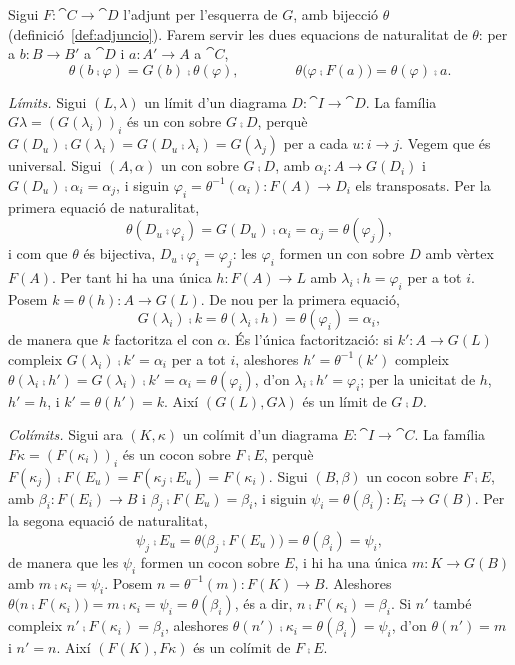 \begin{prova}
Sigui $F\colon\cat{C}\to\cat{D}$ l'adjunt per l'esquerra de $G$, amb bijecció $\theta$ (definició~\ref{def:adjuncio}). Farem servir les dues equacions de naturalitat de $\theta$: per a $b\colon B\to B'$ a $\cat{D}$ i $a\colon A'\to A$ a $\cat{C}$,
\[
\theta(b\comp\varphi)=G(b)\comp\theta(\varphi),
\qquad\qquad
\theta\bigl(\varphi\comp F(a)\bigr)=\theta(\varphi)\comp a.
\]

\emph{Límits.} Sigui $(L,\lambda)$ un límit d'un diagrama $D\colon\cat{I}\to\cat{D}$. La família $G\lambda=(G(\lambda_i))_i$ és un con sobre $G\comp D$, perquè $G(D_u)\comp G(\lambda_i)=G(D_u\comp\lambda_i)=G(\lambda_j)$ per a cada $u\colon i\to j$. Vegem que és universal. Sigui $(A,\alpha)$ un con sobre $G\comp D$, amb $\alpha_i\colon A\to G(D_i)$ i $G(D_u)\comp\alpha_i=\alpha_j$, i siguin $\varphi_i=\theta^{-1}(\alpha_i)\colon F(A)\to D_i$ els transposats. Per la primera equació de naturalitat,
\[
\theta(D_u\comp\varphi_i)=G(D_u)\comp\alpha_i=\alpha_j=\theta(\varphi_j),
\]
i com que $\theta$ és bijectiva, $D_u\comp\varphi_i=\varphi_j$: les $\varphi_i$ formen un con sobre $D$ amb vèrtex $F(A)$. Per tant hi ha una única $h\colon F(A)\to L$ amb $\lambda_i\comp h=\varphi_i$ per a tot $i$. Posem $k=\theta(h)\colon A\to G(L)$. De nou per la primera equació,
\[
G(\lambda_i)\comp k=\theta(\lambda_i\comp h)=\theta(\varphi_i)=\alpha_i,
\]
de manera que $k$ factoritza el con $\alpha$. És l'única factorització: si $k'\colon A\to G(L)$ compleix $G(\lambda_i)\comp k'=\alpha_i$ per a tot $i$, aleshores $h'=\theta^{-1}(k')$ compleix $\theta(\lambda_i\comp h')=G(\lambda_i)\comp k'=\alpha_i=\theta(\varphi_i)$, d'on $\lambda_i\comp h'=\varphi_i$; per la unicitat de $h$, $h'=h$, i $k'=\theta(h')=k$. Així $(G(L),G\lambda)$ és un límit de $G\comp D$.

\emph{Colímits.} Sigui ara $(K,\kappa)$ un colímit d'un diagrama $E\colon\cat{I}\to\cat{C}$. La família $F\kappa=(F(\kappa_i))_i$ és un cocon sobre $F\comp E$, perquè $F(\kappa_j)\comp F(E_u)=F(\kappa_j\comp E_u)=F(\kappa_i)$. Sigui $(B,\beta)$ un cocon sobre $F\comp E$, amb $\beta_i\colon F(E_i)\to B$ i $\beta_j\comp F(E_u)=\beta_i$, i siguin $\psi_i=\theta(\beta_i)\colon E_i\to G(B)$. Per la segona equació de naturalitat,
\[
\psi_j\comp E_u=\theta\bigl(\beta_j\comp F(E_u)\bigr)=\theta(\beta_i)=\psi_i,
\]
de manera que les $\psi_i$ formen un cocon sobre $E$, i hi ha una única $m\colon K\to G(B)$ amb $m\comp\kappa_i=\psi_i$. Posem $n=\theta^{-1}(m)\colon F(K)\to B$. Aleshores $\theta\bigl(n\comp F(\kappa_i)\bigr)=m\comp\kappa_i=\psi_i=\theta(\beta_i)$, és a dir, $n\comp F(\kappa_i)=\beta_i$. Si $n'$ també compleix $n'\comp F(\kappa_i)=\beta_i$, aleshores $\theta(n')\comp\kappa_i=\theta(\beta_i)=\psi_i$, d'on $\theta(n')=m$ i $n'=n$. Així $(F(K),F\kappa)$ és un colímit de $F\comp E$.
\end{prova}


